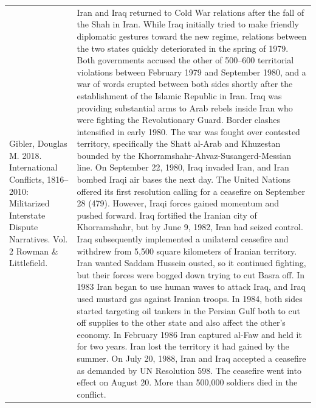 {\begin{longtable}{p{}p{}}
Gibler, Douglas M. 2018. International Conflicts, 1816–2010: Militarized Interstate Dispute Narratives. Vol. 2 Rowman \& Littlefield. & Iran and Iraq returned to Cold War relations after the fall of the Shah in Iran. While Iraq initially tried to make friendly diplomatic gestures toward the new regime, relations between the two states quickly deteriorated in the spring of 1979. Both governments accused the other of 500–600 territorial violations between February 1979 and September 1980, and a war of words erupted between both sides shortly after the establishment of the Islamic Republic in Iran. Iraq was providing substantial arms to Arab rebels inside Iran who were fighting the Revolutionary Guard. Border clashes intensified in early 1980. The war was fought over contested territory, specifically the Shatt al-Arab and Khuzestan bounded by the Khorramshahr-Ahvaz-Susangerd-Messian line. On September 22, 1980, Iraq invaded Iran, and Iran bombed Iraqi air bases the next day. The United Nations offered its first resolution calling for a ceasefire on September 28 (479). However, Iraqi forces gained momentum and pushed forward. Iraq fortified the Iranian city of Khorramshahr, but by June 9, 1982, Iran had seized control. Iraq subsequently implemented a unilateral ceasefire and withdrew from 5,500 square kilometers of Iranian territory. Iran wanted Saddam Hussein ousted, so it continued fighting, but their forces were bogged down trying to cut Basra off. In 1983 Iran began to use human waves to attack Iraq, and Iraq used mustard gas against Iranian troops. In 1984, both sides started targeting oil tankers in the Persian Gulf both to cut off supplies to the other state and also affect the other's economy. In February 1986 Iran captured al-Faw and held it for two years. Iran lost the territory it had gained by the summer. On July 20, 1988, Iran and Iraq accepted a ceasefire as demanded by UN Resolution 598. The ceasefire went into effect on August 20. More than 500,000 soldiers died in the conflict.
\\

\end{longtable}}
